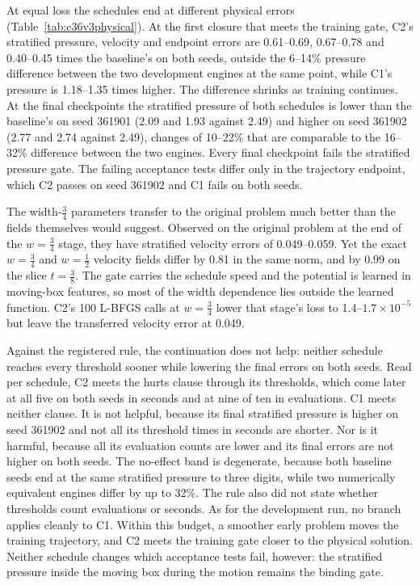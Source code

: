 \documentclass[11pt]{article}
\begin{document}
At equal loss the schedules end at different physical errors
(Table~\ref{tab:c36v3physical}). At the first closure that meets the training
gate, C2's stratified pressure, velocity and endpoint errors are 0.61--0.69,
0.67--0.78 and 0.40--0.45 times the baseline's on both seeds, outside the
6--14\% pressure difference between the two development engines at the same
point, while C1's pressure is 1.18--1.35 times higher. The difference shrinks
as training continues. At the final checkpoints the stratified pressure of
both schedules is lower than the baseline's on seed 361901 (2.09 and 1.93
against 2.49) and higher on seed 361902 (2.77 and 2.74 against 2.49), changes of
10--22\% that are comparable to the 16--32\% difference between the two
engines. Every final checkpoint fails the
stratified pressure gate. The failing acceptance tests differ only in the
trajectory endpoint, which C2 passes on seed 361902 and C1 fails on both
seeds.

The width-$\tfrac34$ parameters transfer to the original problem much better
than the fields themselves would suggest. Observed on the original problem at
the end of the $w=\tfrac34$ stage, they have stratified velocity errors of
0.049--0.059. Yet the exact $w=\tfrac34$ and $w=\tfrac12$ velocity fields
differ by 0.81 in the same norm, and by 0.99 on the slice $t=\tfrac38$. The
gate carries the schedule speed and the potential is learned in moving-box
features, so most of the width dependence lies outside the learned function.
C2's 100 L-BFGS calls at $w=\tfrac34$ lower that stage's loss to
1.4--$1.7\times10^{-5}$ but leave the transferred velocity error at 0.049.

Against the registered rule, the continuation does not help: neither
schedule reaches every threshold sooner while lowering the final errors on
both seeds. Read per schedule, C2 meets the hurts clause through its
thresholds, which come later at all five on both seeds in seconds and at
nine of ten in evaluations. C1 meets neither clause. It is not helpful,
because its final stratified pressure is higher on seed 361902 and not all
its threshold times in seconds are shorter. Nor is it harmful, because all
its evaluation counts are lower and its final errors are not higher on both
seeds. The no-effect band is degenerate, because both baseline
seeds end at the same stratified pressure to three digits, while two
numerically equivalent engines differ by up to 32\%. The rule also did not
state whether thresholds count evaluations or seconds. As for the development
run, no branch applies cleanly to C1. Within this budget, a smoother early
problem moves the training trajectory, and C2 meets the training gate closer
to the physical solution. Neither schedule changes which acceptance tests
fail, however: the stratified pressure inside the moving box during the
motion remains the binding gate.
\end{document}

